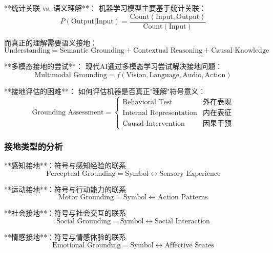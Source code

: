 **统计关联 vs. 语义理解**：
机器学习模型主要基于统计关联：
\begin{equation}
P(\text{Output}|\text{Input}) = \frac{\text{Count}(\text{Input}, \text{Output})}{\text{Count}(\text{Input})}
\end{equation}

而真正的理解需要语义接地：
\begin{equation}
\text{Understanding} = \text{Semantic Grounding} + \text{Contextual Reasoning} + \text{Causal Knowledge}
\end{equation}

**多模态接地的尝试**：
现代AI通过多模态学习尝试解决接地问题：
\begin{equation}
\text{Multimodal Grounding} = f(\text{Vision}, \text{Language}, \text{Audio}, \text{Action})
\end{equation}

**接地评估的困难**：
如何评估机器是否真正"理解"符号意义：
\begin{equation}
\text{Grounding Assessment} = \begin{cases}
\text{Behavioral Test} & \text{外在表现} \\
\text{Internal Representation} & \text{内在表征} \\
\text{Causal Intervention} & \text{因果干预}
\end{cases}
\end{equation}

\subsubsection{接地类型的分析} %

**感知接地**：符号与感知经验的联系
\begin{equation}
\text{Perceptual Grounding} = \text{Symbol} \leftrightarrow \text{Sensory Experience}
\end{equation}

**运动接地**：符号与行动能力的联系
\begin{equation}
\text{Motor Grounding} = \text{Symbol} \leftrightarrow \text{Action Patterns}
\end{equation}

**社会接地**：符号与社会交互的联系
\begin{equation}
\text{Social Grounding} = \text{Symbol} \leftrightarrow \text{Social Interaction}
\end{equation}

**情感接地**：符号与情感体验的联系
\begin{equation}
\text{Emotional Grounding} = \text{Symbol} \leftrightarrow \text{Affective States}
\end{equation}

